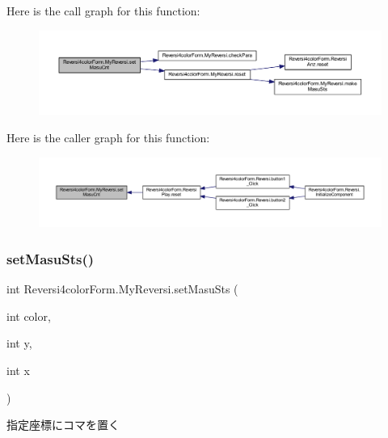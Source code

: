 Here is the call graph for this function\+:
\nopagebreak
\begin{figure}[H]
\begin{center}
\leavevmode
\includegraphics[width=350pt]{class_reversi4color_form_1_1_my_reversi_ae612bc1a7a5ccbd972ce130de910e8e6_cgraph}
\end{center}
\end{figure}
Here is the caller graph for this function\+:
\nopagebreak
\begin{figure}[H]
\begin{center}
\leavevmode
\includegraphics[width=350pt]{class_reversi4color_form_1_1_my_reversi_ae612bc1a7a5ccbd972ce130de910e8e6_icgraph}
\end{center}
\end{figure}
\mbox{\label{class_reversi4color_form_1_1_my_reversi_a7b7f5f6c8ea7961a41cb3dcc4360c9d1}} 
\subsubsection{\texorpdfstring{set\+Masu\+Sts()}{setMasuSts()}}
{\footnotesize\ttfamily int Reversi4color\+Form.\+My\+Reversi.\+set\+Masu\+Sts (\begin{DoxyParamCaption}\item[{int}]{color,  }\item[{int}]{y,  }\item[{int}]{x }\end{DoxyParamCaption})}



指定座標にコマを置く 


